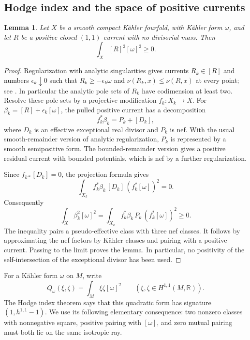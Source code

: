 \documentclass[11pt,letterpaper]{article}
\newtheorem{lemma}[theorem]{Lemma}
\theoremstyle{definition}
\theoremstyle{remark}
\begin{document}
\subsection{Hodge index and the space of positive currents}

\begin{lemma}\label{fol:nonnegative-square}
Let $X$ be a smooth compact K\"ahler fourfold, with K\"ahler form
$\omega$, and let $R$ be a positive closed $(1,1)$-current with no
divisorial mass.  Then
\[
 \int_X [R]^2[\omega]^2\geq0.
\]
\end{lemma}

\begin{proof}
Regularization with analytic singularities gives currents
$R_k\in[R]$ and numbers $\epsilon_k\downarrow0$ such that
$R_k\geq-\epsilon_k\omega$ and
$\nu(R_k,x)\leq\nu(R,x)$ at every point; see
\cite[Theorem~2.1(ii)]{BoucksomDivisorialZariski}.
In particular the analytic pole sets of $R_k$ have codimension at least
two.  Resolve these pole sets by a projective modification
$f_k\colon X_k\to X$.  For
$\beta_k=[R]+\epsilon_k[\omega]$, the pulled positive current has a
decomposition
\[
 f_k^*\beta_k=P_k+[D_k],
\]
where $D_k$ is an effective exceptional real divisor and $P_k$ is nef.
With the usual smooth-remainder version of analytic regularization,
$P_k$ is represented by a smooth semipositive form.  The
bounded-remainder version gives a positive residual current with bounded
potentials, which is nef by a further regularization.

Since $f_{k*}[D_k]=0$, the projection formula gives
\[
 \int_{X_k} f_k^*\beta_k\,[D_k]\,(f_k^*[\omega])^2=0.
\]
Consequently
\begin{equation}\label{fol:square-resolution}
 \int_X\beta_k^2[\omega]^2
 =
 \int_{X_k} f_k^*\beta_k\,P_k\,(f_k^*[\omega])^2
 \geq0.
\end{equation}
The inequality pairs a pseudo-effective class with three nef classes.
It follows by approximating the nef factors by K\"ahler classes and
pairing with a positive current.  Passing to the limit proves the lemma.
In particular, no positivity of the self-intersection of the
exceptional divisor has been used.
\end{proof}

For a K\"ahler form $\omega$ on $M$, write
\[
 Q_\omega(\xi,\zeta)=\int_M\xi\zeta[\omega]^2
 \qquad(\xi,\zeta\in H^{1,1}(M,\mathbb{R})).
\]
The Hodge index theorem says that this quadratic form has signature
$(1,h^{1,1}-1)$.  We use its following elementary consequence:
two nonzero classes with nonnegative square, positive pairing with
$[\omega]$, and zero mutual pairing must both lie on the same isotropic
ray.
\end{document}
